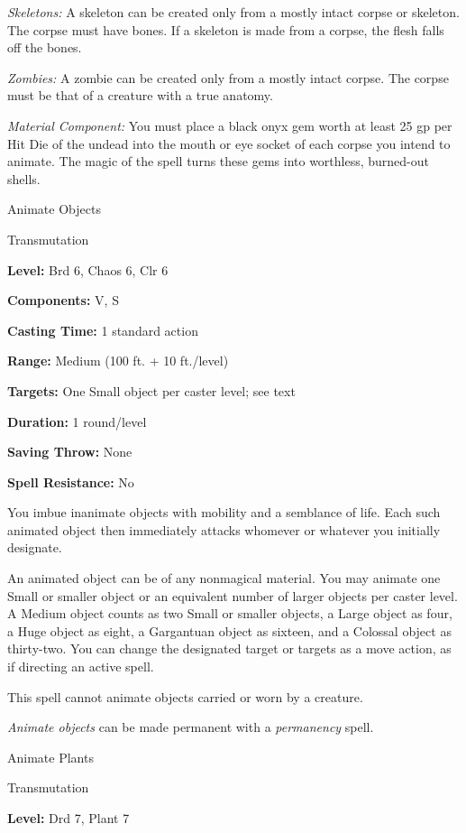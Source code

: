 \documentclass{article}
\begin{document}
\textit{Skeletons: }A skeleton can be created only from a mostly intact corpse 
or skeleton. The corpse must have bones. If a skeleton is made from a corpse, the 
flesh falls off the bones. 

\textit{Zombies: }A zombie can be created only from a mostly intact corpse. The 
corpse must be that of a creature with a true anatomy.

\textit{Material Component: }You must place a black onyx gem worth at least 25 
gp per Hit Die of the undead into the mouth or eye socket of each corpse you intend 
to animate. The magic of the spell turns these gems into worthless, burned-out 
shells.

\vspace{12pt}
Animate Objects

Transmutation

\textbf{Level:} Brd 6, Chaos 6, Clr 6

\textbf{Components:} V, S

\textbf{Casting Time:} 1 standard action

\textbf{Range: }Medium (100 ft. + 10 ft./level)

\textbf{Targets:} One Small object per caster level; see text

\textbf{Duration:} 1 round/level

\textbf{Saving Throw:} None

\textbf{Spell Resistance:} No

You imbue inanimate objects with mobility and a semblance of life. Each such animated 
object then immediately attacks whomever or whatever you initially designate.

An animated object can be of any nonmagical material. You may animate one Small 
or smaller object or an equivalent number of larger objects per caster level. A 
Medium object counts as two Small or smaller objects, a Large object as four, a 
Huge object as eight, a Gargantuan object as sixteen, and a Colossal object as 
thirty-two. You can change the designated target or targets as a move action, as 
if directing an active spell.

This spell cannot animate objects carried or worn by a creature.

\textit{Animate objects }can be made permanent with a \textit{permanency }spell.

\vspace{12pt}
Animate Plants

Transmutation

\textbf{Level:} Drd 7, Plant 7
\end{document}
